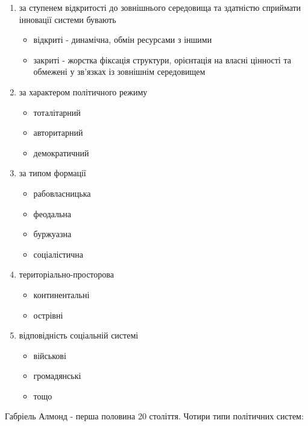 \begin{enumerate}
\item за ступенем відкритості до зовнішнього середовища та здатністю сприймати інновації системи бувають 	      \begin{itemize}
            \item відкриті - динамічна, обмін ресурсами з іншими
            \item закриті - жорстка фіксація структури, орієнтація на власні цінності та обмежені у зв’язках із зовнішнім середовищем
            \end{itemize}
\item за характером політичного режиму
      \begin{itemize}
        \item тоталітарний
        \item авторитарний
        \item демократичний
       \end{itemize}
\item за типом формації 
   \begin{itemize}
   \item рабовласницька
   \item феодальна
   \item буржуазна
   \item соціалістична
   \end{itemize}
\item територіально-просторова
  \begin{itemize}
  \item континентальні
  \item острівні
  \end{itemize}
\item відповідність соціальній системі
  \begin{itemize}
  \item військові
  \item громадянські
  \item тощо
  \end{itemize}
\end{enumerate}
 Габріель Алмонд - перша половина 20 століття. Чотири типи політичних систем:

